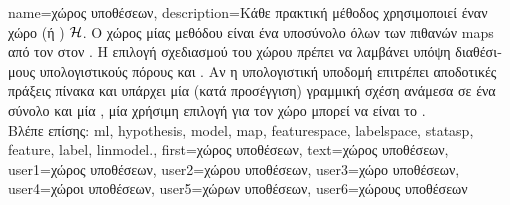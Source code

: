 {name={\foreignlanguage{greek}{χώρος υποθέσεων}}, 
	description={\foreignlanguage{greek}{Κάθε πρακτική μέθοδος} 
		 \foreignlanguage{greek}{χρησιμοποιεί έναν χώρο}  (\foreignlanguage{greek}{ή} 
		) $\mathcal{H}$. \foreignlanguage{greek}{Ο χώρος}  \foreignlanguage{greek}{μίας 
		μεθόδου}  \foreignlanguage{greek}{είναι ένα υποσύνολο όλων των πιθανών} \gls{map}s 
		\foreignlanguage{greek}{από τον}  \foreignlanguage{greek}{στον} . 
		\foreignlanguage{greek}{Η επιλογή σχεδιασμού του χώρου}  \foreignlanguage{greek}{πρέπει να λαμβάνει 
		υπόψη διαθέσιμους υπολογιστικούς πόρους και} . \foreignlanguage{greek}{Αν η υπολογιστική 
		υποδομή επιτρέπει αποδοτικές πράξεις πίνακα και υπάρχει μία (κατά προσέγγιση) γραμμική σχέση ανάμεσα σε ένα σύνολο} 
		 \foreignlanguage{greek}{και μία} , \foreignlanguage{greek}{μία χρήσιμη επιλογή για τον 
		χώρο}  \foreignlanguage{greek}{μπορεί να είναι το} .\\
		\foreignlanguage{greek}{Βλέπε επίσης:} \gls{ml}, \gls{hypothesis}, \gls{model}, \gls{map}, \gls{featurespace}, \gls{labelspace}, 
		\gls{statasp}, \gls{feature}, \gls{label}, \gls{linmodel}.},
	first={\foreignlanguage{greek}{χώρος υποθέσεων}},
	text={\foreignlanguage{greek}{χώρος υποθέσεων}}, 
	user1={\foreignlanguage{greek}{χώρος υποθέσεων}}, %
	user2={\foreignlanguage{greek}{χώρου υποθέσεων}}, %
	user3={\foreignlanguage{greek}{χώρο υποθέσεων}}, %
	user4={\foreignlanguage{greek}{χώροι υποθέσεων}}, %
	user5={\foreignlanguage{greek}{χώρων υποθέσεων}}, %
	user6={\foreignlanguage{greek}{χώρους υποθέσεων}} %
}

